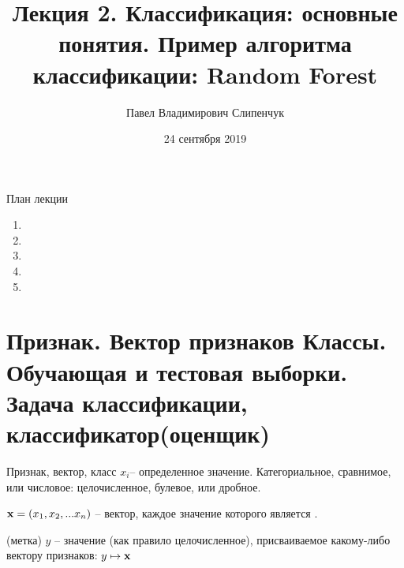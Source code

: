 


\title{Лекция 2. Классификация: основные понятия. Пример алгоритма классификации: Random Forest}
\date{24 сентября 2019}
\author{Павел Владимирович Слипенчук}


  \maketitle
    
  \begin{frame}{План лекции}
    \begin{enumerate}
	\item {}
	\item {}
	\item {}
	\item {}
	\item {}
	\end{enumerate}
 \end{frame}
    
  \section{Признак. Вектор признаков Классы. Обучающая и тестовая выборки. Задача классификации, классификатор(оценщик)}\label{section:classification_defs}
  
  \begin{frame}{Признак, вектор, класс}
     $x_i$-- определенное значение. Категориальное, сравнимое, или числовое: целочисленное, булевое, или дробное.
    
     $\bold x = (x_1, x_2, ... x_n)$ -- вектор, каждое значение которого является . 
  	
  	 (метка) $y$ -- значение (как правило целочисленное), присваиваемое какому-либо вектору признаков: $ y \mapsto \bold x$
  	
  \end{frame}
  
